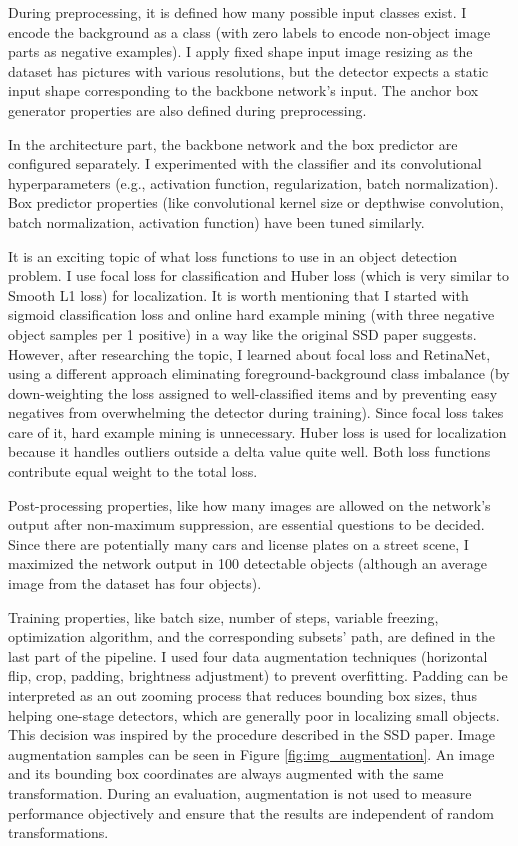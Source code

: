 During preprocessing, it is defined how many possible input classes exist. I encode the background as a class (with zero labels to encode non-object image parts as negative examples). I apply fixed shape input image resizing as the dataset has pictures with various resolutions, but the detector expects a static input shape corresponding to the backbone network’s input. The anchor box generator properties are also defined during preprocessing.

In the architecture part, the backbone network and the box predictor are configured separately. I experimented with the classifier and its convolutional hyperparameters (e.g., activation function, regularization, batch normalization). Box predictor properties (like convolutional kernel size or depthwise convolution, batch normalization, activation function) have been tuned similarly.

It is an exciting topic of what loss functions to use in an object detection problem. I use focal loss\cite{TFSigmoidFocalCrossEntropy} for classification and Huber loss (which is very similar to Smooth L1 loss\cite{SmoothL1Loss}) for localization. It is worth mentioning that I started with sigmoid classification loss and online hard example mining (with three negative object samples per 1 positive) in a way like the original SSD paper\cite{SSD} suggests. However, after researching the topic, I learned about focal loss and RetinaNet\cite{RetinaNet}, using a different approach eliminating foreground-background class imbalance (by down-weighting the loss assigned to well-classified items and by preventing easy negatives from overwhelming the detector during training). Since focal loss takes care of it, hard example mining is unnecessary. Huber loss is used for localization because it handles outliers outside a delta value quite well. Both loss functions contribute equal weight to the total loss.

Post-processing properties, like how many images are allowed on the network’s output after non-maximum suppression, are essential questions to be decided. Since there are potentially many cars and license plates on a street scene, I maximized the network output in 100 detectable objects (although an average image from the dataset has four objects).

Training properties, like batch size, number of steps, variable freezing, optimization algorithm, and the corresponding subsets' path, are defined in the last part of the pipeline. I used four data augmentation techniques (horizontal flip, crop, padding, brightness adjustment) to prevent overfitting. Padding can be interpreted as an out zooming process that reduces bounding box sizes, thus helping one-stage detectors, which are generally poor in localizing small objects. This decision was inspired by the procedure described in the SSD paper\cite{SSD}. Image augmentation samples can be seen in Figure \ref{fig:img_augmentation}. An image and its bounding box coordinates are always augmented with the same transformation. During an evaluation, augmentation is not used to measure performance objectively and ensure that the results are independent of random transformations.

